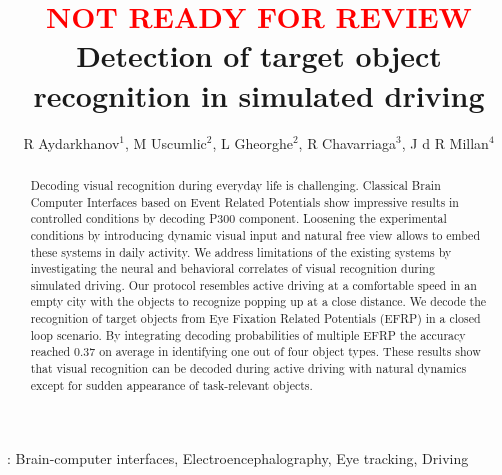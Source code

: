 \documentclass[12pt]{iopart}
\begin{document}
\title[]{\textcolor{red}{NOT READY FOR REVIEW} Detection of target object recognition in simulated driving}

\author{R Aydarkhanov$^1$,
M Uscumlic$^2$,
L Gheorghe$^2$,
R Chavarriaga$^3$,
J d R Millan$^4$}


\address{$^1$EPFL, Switzerland}
\address{$^2$EPFL, Switzerland}
\address{$^3$EPFL, Switzerland}
\address{$^4$TU Austin, USA}
\vspace{10pt}

\begin{abstract}
    Decoding visual recognition during everyday life is challenging.
    Classical Brain Computer Interfaces based on Event Related Potentials
    show impressive results in controlled conditions by decoding P300 component.
    Loosening the experimental conditions by introducing dynamic
    visual input and natural free view allows to embed these systems
    in daily activity. We address limitations of the existing
    systems by investigating the neural and behavioral correlates
    of visual recognition during simulated driving.
    Our protocol resembles active driving at a comfortable speed in an empty
    city with the objects to recognize popping up at a close distance.
    We decode the recognition of target objects from 
    Eye Fixation Related Potentials (EFRP) in a closed loop scenario.
    By integrating decoding probabilities of multiple EFRP the accuracy 
    reached 0.37 on average
    in identifying one out of four object types. 
    These results show that visual recognition can be decoded during
    active driving with natural dynamics except for sudden appearance
    of task-relevant objects.
    
\end{abstract}

%
\vspace{2pc}
: Brain-computer interfaces, Electroencephalography, Eye tracking, Driving
%
%
% 
%
\end{document}
